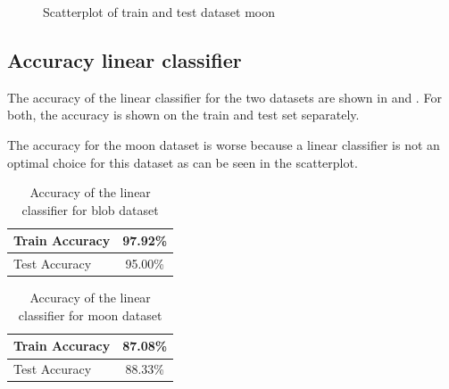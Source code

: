 \documentclass[12pt,a4paper]{scrartcl}
\begin{document}
	\begin{figure}[H]
		\centering	
		\caption{Scatterplot of train and test dataset moon}
		\label{fig:ex1_2_data_moon}
	\end{figure}
	 
	 \subsection*{Accuracy linear classifier}
	 
	 The accuracy of the linear classifier for the two datasets are shown in  and . For both, the accuracy is shown on the train and test set separately.
	 
	 The accuracy for the moon dataset is worse because a linear classifier is not an optimal choice for this dataset as can be seen in the scatterplot.
	 
	 
	\begin{table}[H]
		\centering
		\begin{tabular}{|l|c|}
			\hline
			Train Accuracy & 97.92\% \\ \hline
			Test Accuracy  & 95.00\% \\ \hline
		\end{tabular}
		\caption{Accuracy of the linear classifier for blob dataset}
		\label{tab:ex1_2_accuracy_blob}
	\end{table}

	\begin{table}[H]
		\centering
		\begin{tabular}{|l|c|}
			\hline
			Train Accuracy & 87.08\% \\ \hline
			Test Accuracy  & 88.33\% \\ \hline
		\end{tabular}
		\caption{Accuracy of the linear classifier for moon dataset}
		\label{tab:ex1_2_accuracy_moon}
	\end{table}
	
\end{document}
